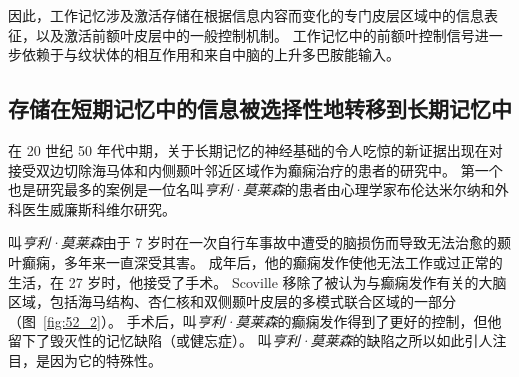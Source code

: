 因此，工作记忆涉及激活存储在根据信息内容而变化的专门皮层区域中的信息表征，以及激活前额叶皮层中的一般控制机制。
工作记忆中的前额叶控制信号进一步依赖于与纹状体的相互作用和来自中脑的上升多巴胺能输入。



\subsection{存储在短期记忆中的信息被选择性地转移到长期记忆中}

在 20 世纪 50 年代中期，关于长期记忆的神经基础的令人吃惊的新证据出现在对接受双边切除海马体和内侧颞叶邻近区域作为癫痫治疗的患者的研究中。
第一个也是研究最多的案例是一位名叫\textit{亨利·莫莱森}的患者由心理学家布伦达米尔纳和外科医生威廉斯科维尔研究。


叫\textit{亨利·莫莱森}由于 7 岁时在一次自行车事故中遭受的脑损伤而导致无法治愈的颞叶癫痫，多年来一直深受其害。
成年后，他的癫痫发作使他无法工作或过正常的生活，在 27 岁时，他接受了手术。
Scoville 移除了被认为与癫痫发作有关的大脑区域，包括海马结构、杏仁核和双侧颞叶皮层的多模式联合区域的一部分（图~\ref{fig:52_2}）。
手术后，叫\textit{亨利·莫莱森}的癫痫发作得到了更好的控制，但他留下了毁灭性的记忆缺陷（或健忘症）。
叫\textit{亨利·莫莱森}的缺陷之所以如此引人注目，是因为它的特殊性。


